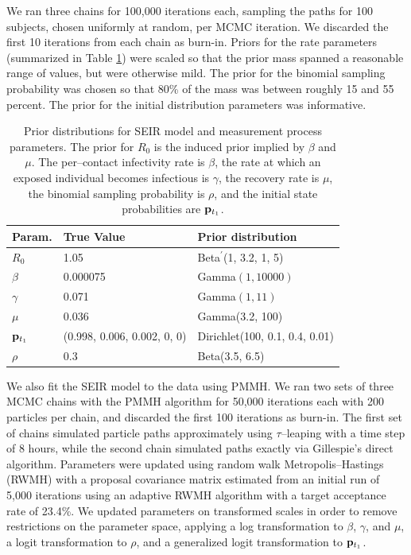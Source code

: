 We ran three chains for 100,000 iterations each, sampling the paths for 100 subjects, chosen uniformly at random, per MCMC iteration. We discarded the first 10 iterations from each chain as burn-in. Priors for the rate parameters (summarized in Table \ref{tab:sim1_seir_priors}) were scaled so that the prior mass spanned a reasonable range of values, but were otherwise mild. The prior for the binomial sampling probability was chosen so that 80\% of the mass was between roughly 15 and 55 percent. The prior for the initial distribution parameters was informative.

\begin{table}[htbp]
	\centering
	\begin{tabular}{lll}
		\hline
		Param. & True Value & Prior distribution \\ 
		\hline
		$ R_0 $ & 1.05 & Beta$ ^\prime $(1, 3.2, 1, 5) \\
		$ \beta $ & 0.000075 & Gamma$ (1, 10000) $ \\
		$ \gamma $ & 0.071 & Gamma$ (1, 11) $\\ 
		$ \mu $ & 0.036 & Gamma(3.2, 100)  \\ 
		$ \mathbf{p}_{t_1} $ & (0.998, 0.006, 0.002, 0, 0) & Dirichlet(100, 0.1, 0.4, 0.01)  \\ 
		$ \rho $ & 0.3 & Beta(3.5, 6.5) \\
		\hline
	\end{tabular}
	\caption[Simulation 1 SEIR model priors.]{Prior distributions for SEIR model and measurement process parameters. The prior for $ R_0 $ is the induced prior implied by $ \beta $ and $ \mu $. The per--contact infectivity rate is $ \beta $, the rate at which an exposed individual becomes infectious is $ \gamma $, the recovery rate is $ \mu $, the binomial sampling probability is $ \rho $, and the initial state probabilities are $ \mathbf{p}_{t_1} $.}
	\label{tab:sim1_seir_priors}
\end{table}

We also fit the SEIR model to the data using PMMH. We ran two sets of three MCMC chains with the PMMH algorithm for 50,000 iterations each with 200 particles per chain, and discarded the first 100 iterations as burn-in. The first set of chains simulated particle paths approximately using $ \tau $--leaping with a time step of 8 hours, while the second chain simulated paths exactly via Gillespie's direct algorithm. Parameters were updated using random walk Metropolis--Hastings (RWMH) with a proposal covariance matrix estimated from an initial run of 5,000 iterations using an adaptive RWMH algorithm with a target acceptance rate of 23.4\%. We updated parameters on transformed scales in order to remove restrictions on the parameter space, applying a log transformation to $ \beta $, $ \gamma $, and $ \mu $, a logit transformation to $ \rho $, and a generalized logit transformation to $ \mathbf{p}_{t_1} $.

